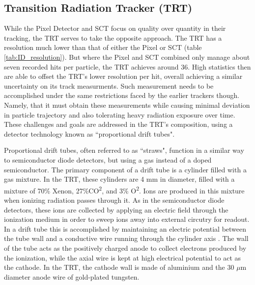     \subsection{Transition Radiation Tracker (TRT)}
            While the Pixel Detector and SCT focus on quality over quantity in their tracking, the TRT serves to take the opposite approach.
            The TRT has a resolution much lower than that of either the Pixel or SCT (table \ref{tab:ID_resolution}).
            But where the Pixel and SCT combined only manage about seven recorded hits per particle, the TRT achieves around 36.
            High statistics then are able to offset the TRT's lower resolution per hit, overall achieving a similar uncertainty on its track measurments.
            Such measurement needs to be accomplished under the same restrictions faced by the earlier trackers though.
            Namely, that it must obtain these measurements while causing minimal deviation in particle trajectory and also tolerating heavy radiation exposure over time.
            These challenges and goals are addressed in the TRT's composition, using a detector technology known as ``proportional drift tubes".

            Proportional drift tubes, often referred to as ``straws", function in a similar way to semiconductor diode detectors, but using a gas instead of a doped semiconductor.
            The primary component of a drift tube is a cylinder filled with a gas mixture.
            In the TRT, these cylinders are 4 mm in diameter, filled with a mixture of 70\% Xenon, 27\%CO\textsuperscript{2}, and 3\% O\textsuperscript{2}.
            Ions are produced in this mixture when ionizing radiation passes through it.
            As in the semiconductor diode detectors, these ions are collected by applying an electric field through the ionization medium in order to sweep ions away into external circutry for readout.
            In a drift tube this is accomplished by maintaining an electric potential between the tube wall and a conductive wire running through the cylinder axis \cite{drift_chambers}.
            The wall of the tube acts as the positively charged anode to collect electrons produced by the ionization, while the axial wire is kept at high electrical potential to act as the cathode.
            In the TRT, the cathode wall is made of aluminium and the 30 $\mu$m diameter anode wire of gold-plated tungsten. \cite{trt_design}

